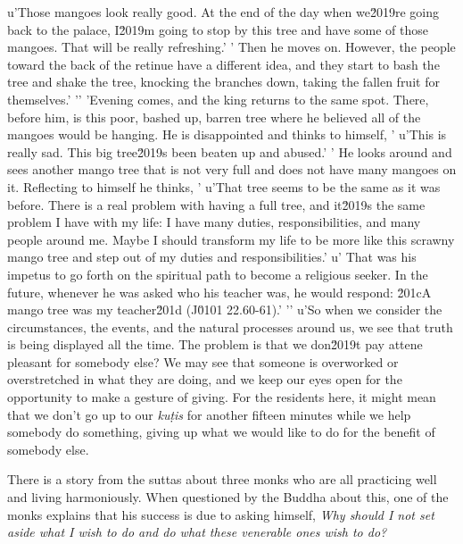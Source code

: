 {u'Those mangoes look really good. At the end of the day when we\u2019re going back to the palace, I\u2019m going to stop by this tree and have some of those mangoes. That will be really refreshing.'
' Then he moves on. However, the people toward the back of the retinue have a different idea, and they start to bash the tree and shake the tree, knocking the branches down, taking the fallen fruit for themselves.'
'\n'
'Evening comes, and the king returns to the same spot. There, before him, is this poor, bashed up, barren tree where he believed all of the mangoes would be hanging. He is disappointed and thinks to himself, '
u'This is really sad. This big tree\u2019s been beaten up and abused.'
' He looks around and sees another mango tree that is not very full and does not have many mangoes on it. Reflecting to himself he thinks, '
u'That tree seems to be the same as it was before. There is a real problem with having a full tree, and it\u2019s the same problem I have with my life: I have many duties, responsibilities, and many people around me. Maybe I should transform my life to be more like this scrawny mango tree and step out of my duties and responsibilities.'
u' That was his impetus to go forth on the spiritual path to become a religious seeker. In the future, whenever he was asked who his teacher was, he would respond: \u201cA mango tree was my teacher\u201d (J\u0101 22.60-61).'
'\n'
u'So when we consider the circumstances, the events, and the natural processes around us, we see that truth is being displayed all the time. The problem is that we don\u2019t pay attene pleasant for somebody else?} We may 
see that someone is overworked or overstretched in what they are doing, 
and we keep our eyes open for the opportunity to make a gesture of 
giving. For the residents here, it might mean that we don't go up to 
our \emph{kuṭis} for another fifteen minutes while we help somebody 
do something, giving up what we would like to do for the benefit of 
somebody else.

There is a story from the suttas about three monks who are all 
practicing well and living harmoniously. When questioned by the Buddha 
about this, one of the monks explains that his success is due to asking 
himself, \emph{Why should I not set aside what I wish to do and do what 
these venerable ones wish to do?}

